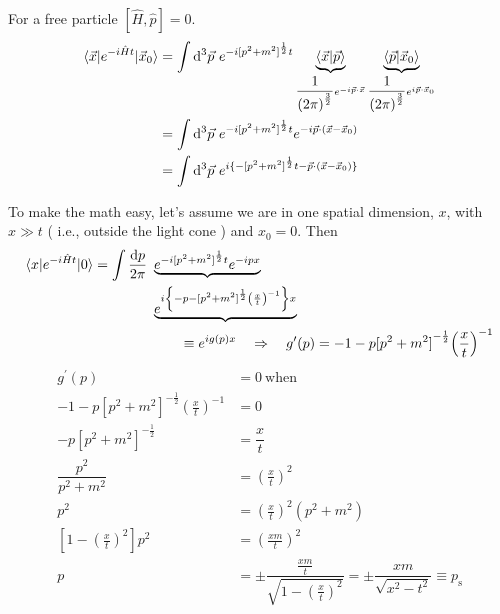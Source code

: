 \documentclass{article}
\begin{document}
\noindent For a free particle $[ \hat{H}, \hat{p} ] = 0 $.
\begin{align}
\braket{ \vec{x} | e^{ -i \hat{H} t } | \vec{x}_0 } &= \int \mathrm{d}^3 \vec{p} ~ e^{ -i {[ p^2 + m^2 ]}^\frac{1}{2} t } \underbrace{\braket{ \vec{x} | \vec{p} }}_{ \dfrac{1}{{(2 \pi)}^\frac{3}{2}} e^{ -i \vec{p} \cdot \vec{x} } } \underbrace{\braket{ \vec{p} | \vec{x}_0 }}_{ \dfrac{1}{{(2 \pi)}^\frac{3}{2}} e^{ i \vec{p} \cdot \vec{x}_0 } } \nonumber\\
&= \int \mathrm{d}^3 \vec{p} ~ e^{ -i {[ p^2 + m^2 ]}^\frac{1}{2} t } e^{ -i \vec{p} \cdot ( \vec{x} - \vec{x}_0 ) } \nonumber\\
&= \int \mathrm{d}^3 \vec{p} ~ e^{ i \lbrace -{[ p^2 + m^2 ]}^\frac{1}{2} t - \vec{p} \cdot ( \vec{x} - \vec{x}_0 ) \rbrace }
\end{align}

\noindent To make the math easy, let's assume we are in one spatial dimension, $x$, with $ x \gg t $ ( i.e., outside the light cone ) and $ x_0 = 0 $.
Then
\begin{align}
\braket{ x | e^{ -i \hat{H} t } | 0 } = \int \dfrac{\mathrm{d} p}{2 \pi} ~ & \underbrace{e^{ -i {[ p^2 + m^2 ]}^\frac{1}{2} t  } e^{ -i p x }} \nonumber \\
& \underbrace{e^{ i \left\lbrace -p - {[ p^2 + m^2 ]}^\frac{1}{2} {\left( \frac{x}{t} \right)}^{-1} \right\rbrace x }} \nonumber\\
&\qquad \equiv e^{ i g(p) x } \quad \Rightarrow \quad g^\prime (p) = -1 - p {[ p^2 + m^2 ]}^{ -\frac{1}{2} } {\left( \frac{x}{t} \right)}^{-1}
\end{align}
\begin{align}
g^\prime (p) &= 0 ~ \mathrm{when} \nonumber \\
-1 - p {[ p^2 + m^2 ]}^{ -\frac{1}{2} } {\left( \frac{x}{t} \right)}^{-1} &= 0 \nonumber\\
-p {[ p^2 + m^2 ]}^{ -\frac{1}{2} } &= \dfrac{x}{t} \nonumber\\
\dfrac{p^2}{ p^2 + m^2 } &= {\left( \frac{x}{t} \right)}^2 \nonumber\\
p^2 &= {\left( \frac{x}{t} \right)}^2 \left( p^2 + m^2 \right) \nonumber\\
\left[ 1 - {\left( \frac{x}{t} \right)}^2 \right] p^2 &= {\left( \frac{ x m }{t} \right)}^2 \nonumber\\
p &= \pm \dfrac{ \frac{ x m }{t} }{ \sqrt{ 1 - {\left( \frac{x}{t} \right)}^2 } } = \pm \dfrac{ x m }{ \sqrt{ x^2 - t^2 } } \equiv p_\mathrm{s}
\end{align}
\end{document}
